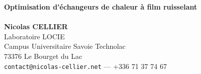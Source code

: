 \documentclass[a0,portrait]{a0poster}
\begin{document}


\begin{minipage}[b]{0.5\linewidth}
\veryHuge \color{NavyBlue} \textbf{Optimisation d'échangeurs de chaleur à film ruisselant} \color{Black}\\ %
\Huge\textit{}\\[2cm] %
\huge \textbf{Nicolas CELLIER}\\[0.5cm] %
\huge Laboratoire LOCIE\\
Campus Universitaire Savoie Technolac\\
73376 Le Bourget du Lac\\[0.4cm] %
\Large \texttt{contact@nicolas-cellier.net} --- +336 71 37 74 67\\
\end{minipage}
%
\end{document}
